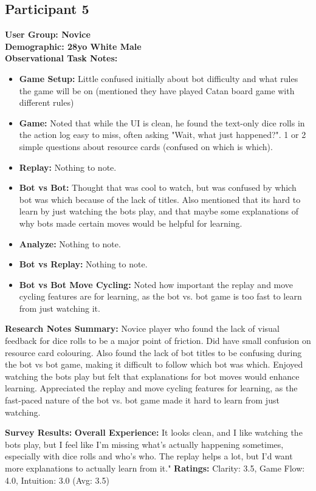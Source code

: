 \documentclass[12pt]{article}
\begin{document}
\subsection{Participant 5}
\textbf {User Group: Novice} \\
\textbf {Demographic: 28yo White Male} \\
\textbf{Observational Task Notes:}
\begin{itemize}
    \item \textbf{Game Setup:} Little confused initially about bot difficulty and what rules the game will be on (mentioned they have played Catan board game with different rules)
    \item \textbf{Game:} Noted that while the UI is clean, he found the text-only dice rolls in the action log easy to miss, often asking "Wait, what just happened?". 1 or 2 simple questions about resource cards (confused on which is which).
    \item \textbf{Replay:} Nothing to note.
    \item \textbf{Bot vs Bot:} Thought that was cool to watch, but was confused by which bot was which because of the lack of titles. Also mentioned that its hard to learn by just watching the bots play, and that maybe some explanations of why bots made certain moves would be helpful for learning.
    \item \textbf{Analyze:} Nothing to note.
    \item \textbf{Bot vs Replay:} Nothing to note.
    \item \textbf{Bot vs Bot Move Cycling:} Noted how important the replay and move cycling features are for learning, as the bot vs. bot game is too fast to learn from just watching it.
\end{itemize}
\textbf{Research Notes Summary:} Novice player who found the lack of visual feedback for dice rolls to be a major point of friction. Did have small confusion on resource card colouring. Also found the lack of bot titles to be confusing during the bot vs bot game, making it difficult to follow which bot was which. Enjoyed watching the bots play but felt that explanations for bot moves would enhance learning. Appreciated the replay and move cycling features for learning, as the fast-paced nature of the bot vs. bot game made it hard to learn from just watching.

\textbf{Survey Results:}
\subitem \textbf{Overall Experience:} It looks clean, and I like watching the bots play, but I feel like I’m missing what’s actually happening sometimes, especially with dice rolls and who’s who. The replay helps a lot, but I’d want more explanations to actually learn from it."
\subitem \textbf{Ratings:} Clarity: 3.5, Game Flow: 4.0, Intuition: 3.0 (Avg: 3.5)
\end{document}
